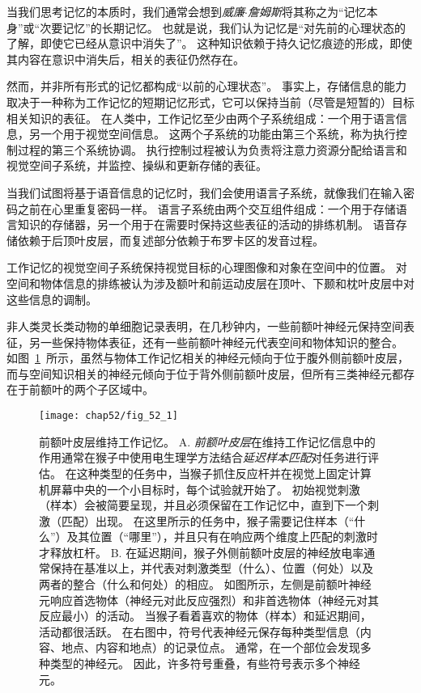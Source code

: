 当我们思考记忆的本质时，我们通常会想到\textit{威廉$\cdot$詹姆斯}将其称之为“记忆本身”或“次要记忆”的长期记忆。
也就是说，我们认为记忆是“对先前的心理状态的了解，即使它已经从意识中消失了”。
这种知识依赖于持久记忆痕迹的形成，即使其内容在意识中消失后，相关的表征仍然存在。


然而，并非所有形式的记忆都构成“以前的心理状态”。
事实上，存储信息的能力取决于一种称为工作记忆的短期记忆形式，它可以保持当前（尽管是短暂的）目标相关知识的表征。
在人类中，工作记忆至少由两个子系统组成：一个用于语言信息，另一个用于视觉空间信息。
这两个子系统的功能由第三个系统，称为执行控制过程的第三个系统协调。
执行控制过程被认为负责将注意力资源分配给语言和视觉空间子系统，并监控、操纵和更新存储的表征。


当我们试图将基于语音信息的记忆时，我们会使用语言子系统，就像我们在输入密码之前在心里重复密码一样。
语言子系统由两个交互组件组成：一个用于存储语言知识的存储器，另一个用于在需要时保持这些表征的活动的排练机制。
语音存储依赖于后顶叶皮层，而复述部分依赖于布罗卡区的发音过程。


工作记忆的视觉空间子系统保持视觉目标的心理图像和对象在空间中的位置。
对空间和物体信息的排练被认为涉及额叶和前运动皮层在顶叶、下颞和枕叶皮层中对这些信息的调制。


非人类灵长类动物的单细胞记录表明，在几秒钟内，一些前额叶神经元保持空间表征，另一些保持物体表征，还有一些前额叶神经元代表空间和物体知识的整合。
如图~\ref{fig:52_1}~所示，虽然与物体工作记忆相关的神经元倾向于位于腹外侧前额叶皮层，而与空间知识相关的神经元倾向于位于背外侧前额叶皮层，但所有三类神经元都存在于前额叶的两个子区域中。


\begin{figure}[htbp]
	\centering
	\texttt{[image: chap52/fig\_52\_1]}
	\caption{前额叶皮层维持工作记忆\cite{rainer1998memory}。
		A. \textit{前额叶皮层}在维持工作记忆信息中的作用通常在猴子中使用电生理学方法结合\textit{延迟样本匹配}对任务进行评估。
		在这种类型的任务中，当猴子抓住反应杆并在视觉上固定计算机屏幕中央的一个小目标时，每个试验就开始了。
		初始视觉刺激（样本）会被简要呈现，并且必须保留在工作记忆中，直到下一个刺激（匹配）出现。
		在这里所示的任务中，猴子需要记住样本（“什么”）及其位置（“哪里”），并且只有在响应两个维度上匹配的刺激时才释放杠杆。
		B. 在延迟期间，猴子外侧前额叶皮层的神经放电率通常保持在基准以上，并代表对刺激类型（什么）、位置（何处）以及两者的整合（什么和何处）的相应。
		如图所示，左侧是前额叶神经元响应首选物体（神经元对此反应强烈）和非首选物体（神经元对其反应最小）的活动。
		当猴子看着喜欢的物体（样本）和延迟期间，活动都很活跃。
		在右图中，符号代表神经元保存每种类型信息（内容、地点、内容和地点）的记录位点。
		通常，在一个部位会发现多种类型的神经元。
		因此，许多符号重叠，有些符号表示多个神经元。}
	\label{fig:52_1}
\end{figure}


